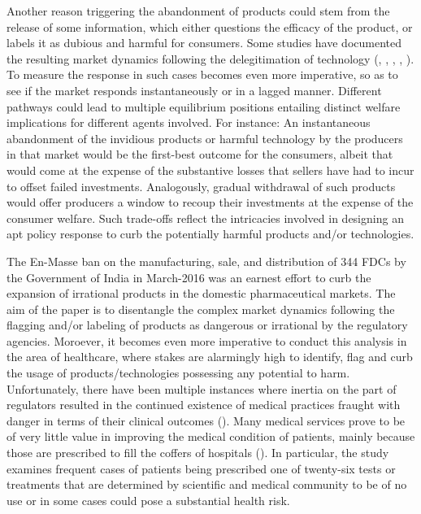 \documentclass[AER]{AEA}
\theoremstyle{theorem}
\begin{document}
Another reason triggering the abandonment of products could stem from the release of some information, which either questions the efficacy of the product, or labels it as dubious and harmful for consumers. Some studies have documented the resulting market dynamics following the delegitimation of technology (\cite{howard2012comparative}, \cite{aggarwal2020science} , \cite{finkelstein1985scientific}, \cite{greve1995jumping}, \cite{kennedy2011diffusion}). To measure the response in such cases becomes even more imperative, so as  to see if the market responds instantaneously or in a lagged manner. Different pathways could lead to multiple equilibrium positions entailing distinct welfare implications for different agents involved. For instance: An instantaneous abandonment of the invidious products or harmful technology by the producers in that market would be the first-best outcome for the consumers, albeit that would come at the expense of the substantive losses that sellers have had to incur to offset failed investments. Analogously, gradual withdrawal of such products would offer producers a window to recoup their investments at the expense of the consumer welfare. Such trade-offs reflect the intricacies involved in designing an apt policy response to curb the potentially harmful products and/or technologies.  

The En-Masse ban on the manufacturing, sale, and distribution of 344 FDCs  by the Government of India in March-2016 was an earnest effort to curb the expansion of irrational products in the domestic pharmaceutical markets. The aim of the paper is to disentangle the complex market dynamics following the flagging and/or labeling of products as dangerous or irrational by the regulatory agencies. Moroever, it becomes even more imperative to conduct this analysis in the area of healthcare, where stakes are alarmingly high to identify, flag and curb the usage of products/technologies possessing any potential to harm. Unfortunately, there have been multiple instances where inertia on the part of  regulators resulted in the continued existence of  medical practices  fraught with danger in terms of their clinical outcomes (\cite{gawande2015avalanche}). Many medical services prove to be of very little value in improving the medical condition of patients, mainly because those are prescribed to fill the coffers of hospitals (\cite{schwartz2014measuring}). In particular, the study examines frequent cases of patients being prescribed one of twenty-six tests or treatments that are determined by scientific and medical community to be of no use or in some cases could pose a substantial health risk.
\end{document}
